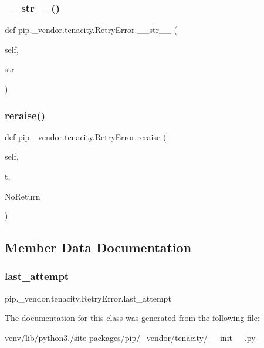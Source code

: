 \subsubsection{\texorpdfstring{\+\_\+\+\_\+str\+\_\+\+\_\+()}{\_\_str\_\_()}}
{\footnotesize\ttfamily def pip.\+\_\+vendor.\+tenacity.\+Retry\+Error.\+\_\+\+\_\+str\+\_\+\+\_\+ (\begin{DoxyParamCaption}\item[{}]{self,  }\item[{}]{str }\end{DoxyParamCaption})}

\mbox{\label{classpip_1_1__vendor_1_1tenacity_1_1RetryError_ac9013494b28491215483f8387b661922}} 
\subsubsection{\texorpdfstring{reraise()}{reraise()}}
{\footnotesize\ttfamily def pip.\+\_\+vendor.\+tenacity.\+Retry\+Error.\+reraise (\begin{DoxyParamCaption}\item[{}]{self,  }\item[{}]{t,  }\item[{}]{No\+Return }\end{DoxyParamCaption})}



\subsection{Member Data Documentation}
\mbox{\label{classpip_1_1__vendor_1_1tenacity_1_1RetryError_a2a3522db72b3af7992c4163a281c8706}} 
\subsubsection{\texorpdfstring{last\+\_\+attempt}{last\_attempt}}
{\footnotesize\ttfamily pip.\+\_\+vendor.\+tenacity.\+Retry\+Error.\+last\+\_\+attempt}



The documentation for this class was generated from the following file\+:\begin{DoxyCompactItemize}
\item 
venv/lib/python3./site-\/packages/pip/\+\_\+vendor/tenacity/\hyperlink{venv_2lib_2python3_89_2site-packages_2pip_2__vendor_2tenacity_2____init_____8py}{\+\_\+\+\_\+init\+\_\+\+\_\+.\+py}\end{DoxyCompactItemize}
